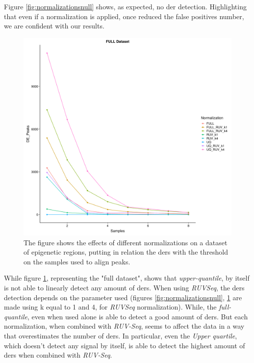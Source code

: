 Figure \ref{fig:normalizationsnull} shows, as expected, no \gls{der} detection. 
Highlighting that even if a normalization is applied, once reduced the false positives number, we are confident with our results.


\begin{figure}[H]
\centering
\includegraphics[width=\textwidth, keepaspectratio]{img/descan2/full_final.pdf}
\caption[Normalizations applied to detected regions]{The figure shows the effects of different normalizations on a dataset of epigenetic regions, putting in relation the \glspl{der} with the threshold on the samples used to align peaks.}
\label{fig:normalizationsfull}
\centering
\end{figure}

While figure \ref{fig:normalizationsfull}, representing the "full dataset", shows that \textit{upper-quantile}, by itself is not able to linearly detect any amount of \glspl{der}.
When using \textit{RUVSeq}, the \glspl{der} detection depends on the parameter used (figures \ref{fig:normalizationsnull}, \ref{fig:normalizationsfull} are made using k equal to 1 and 4, for \textit{RUVSeq} normalization).
While, the \textit{full-quantile}, even when used alone is able to detect a good amount of \glspl{der}.
But each normalization, when combined with \textit{RUV-Seq}, seems to affect the data in a way that overestimates the number of \glspl{der}. 
In particular, even the \textit{Upper quartile}, which doesn't detect any signal by itself, is able to detect the highest amount of \glspl{der} when combined with \textit{RUV-Seq}.

